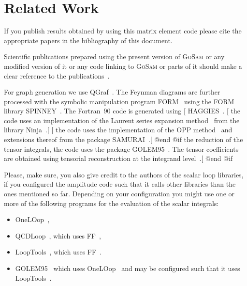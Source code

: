 {{{{{{{\printindex

\section{Related Work}
If you publish results obtained by using this matrix element code
please cite the appropriate papers in the bibliography of this document.

Scientific publications prepared using the present version of
\textsc{GoSam} or any modified version of it or any code linking to
\textsc{GoSam} or parts of it should make a clear
reference to the publications~\cite{Cullen:2014yla,Cullen:2011ac}.

For graph generation we use QGraf~\cite{Nogueira:1991ex}.
The Feynman diagrams are further processed with the symbolic manipulation
program FORM~\cite{Kuipers:2012rf,Vermaseren:2000nd} using the FORM library
SPINNEY~\cite{Cullen:2010jv}.
The Fortran~90 code is generated using 
[%
HAGGIES~\cite{Reiter:2009ts}.
[%
the code uses an implementation of the Laurent series expansion 
method~\cite{Mastrolia:2012bu}
from the library Ninja~\cite{Peraro:2014cba}.[%
[%
the code uses the implementation of the OPP
method~\cite{Ossola:2006us,Ossola:2007bb}
and extensions thereof from the package
SAMURAI~\cite{Mastrolia:2010nb}.[%
@end @if %
the reduction of the tensor integrals, the code uses the 
package GOLEM95~\cite{Guillet:2013msa,Binoth:2008uq,Cullen:2011kv}.
The tensor coefficients are
obtained using tensorial reconstruction at the integrand
level~\cite{Heinrich:2010ax}.[%
@end @if %

Please, make sure, you also give credit to the authors of the scalar
loop libraries, if you configured the amplitude code such that it calls
other libraries than the ones mentioned so far. Depending on your
configuration you might use one or more of the following programs for
the evaluation of the scalar integrals:
\begin{itemize}
\item OneLOop~\cite{vanHameren:2010cp},
\item QCDLoop~\cite{Ellis:2007qk}, which uses FF~\cite{vanOldenborgh:1990yc},
\item LoopTools~\cite{Hahn:1998yk}, which uses FF~\cite{vanOldenborgh:1990yc}.
\item GOLEM95~\cite{Binoth:2008uq,Guillet:2013msa} which uses OneLOop~\cite{vanHameren:2010cp}
   and may be configured such that it uses
   LoopTools~\cite{Hahn:1998yk,vanOldenborgh:1990yc}.
\end{itemize}

}}}}}}}
